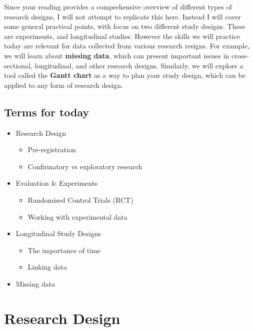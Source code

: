 \documentclass[
]{book}
\providecommand{\tightlist}{%
  \setlength{\itemsep}{0pt}\setlength{\parskip}{0pt}}
\begin{document}
Since your reading provides a comprehensive overview of different types of research designs, I will not attempt to replicate this here. Instead I will cover some general practical points, with focus on two different study designs. These are experiments, and longitudinal studies. However the skills we will practice today are relevant for data collected from various research resigns. For example, we will learn about \textbf{missing data}, which can present important issues in cross-sectional, longitudinal, and other research designs. Similarly, we will explore a tool called the \textbf{Gantt chart} as a way to plan your study design, which can be applied to any form of research design.

\hypertarget{terms-for-today-3}{%
\subsection{Terms for today}\label{terms-for-today-3}}

\begin{itemize}
\tightlist
\item
  Research Design

  \begin{itemize}
  \tightlist
  \item
    Pre-registration
  \item
    Confirmatory vs exploratory research
  \end{itemize}
\item
  Evaluation \& Experiments

  \begin{itemize}
  \tightlist
  \item
    Randomised Control Trials (RCT)
  \item
    Working with experimental data
  \end{itemize}
\item
  Longitudinal Study Designs

  \begin{itemize}
  \tightlist
  \item
    The importance of time
  \item
    Linking data
  \end{itemize}
\item
  Missing data
\end{itemize}

\hypertarget{research-design}{%
\section{Research Design}\label{research-design}}
\end{document}
